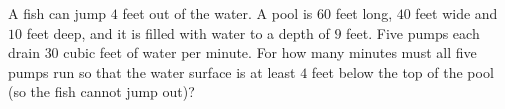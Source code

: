 A fish can jump $4$ feet out of the water. A pool is $60$ feet long, $40$ feet wide and $10$ feet deep, and it is filled with water to a depth of $9$ feet. Five pumps each drain $30$ cubic feet of water per minute. For how many minutes must all five pumps run so that the water surface is at least $4$ feet below the top of the pool (so the fish cannot jump out)?

